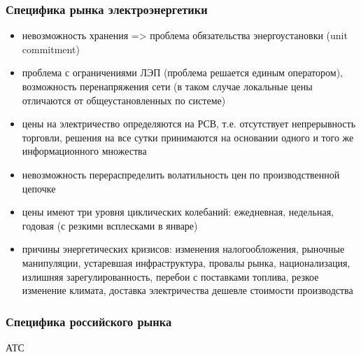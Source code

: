 \documentclass[c, dvipsnames]{beamer}  %
\begin{document}
\begin{frame}[shrink=5]
\frametitle{Специфика рынка электроэнергетики} 

\begin{itemize}
	\item невозможность хранения => проблема обязательства энергоустановки (unit commitment)
	\item проблема с ограничениями ЛЭП (проблема решается единым оператором), возможность перенапряжения сети (в таком случае локальные цены отличаются от общеустановленных по системе) 
	\item цены на электричество определяются на РСВ, т.е. отсутствует непрерывность торговли, решения на все сутки принимаются на основании одного и того же информационного множества
	\item невозможность перераспределить волатильность цен по производственной цепочке 
	\item  цены имеют три уровня циклических колебаний: ежедневная, недельная, годовая (с резкими всплесками в январе)
	\item причины энергетических кризисов: изменения налогообложения, рыночные манипуляции, устаревшая инфраструктура, провалы рынка, национализация, излишняя зарегулированность, перебои с поставками топлива, резкое изменение климата,  доставка электричества дешевле стоимости производства 
	  
\end{itemize}


\end{frame}


\begin{frame}[shrink=5]
\frametitle{Специфика российского рынка} 


АТС


\end{frame}
\end{document}
